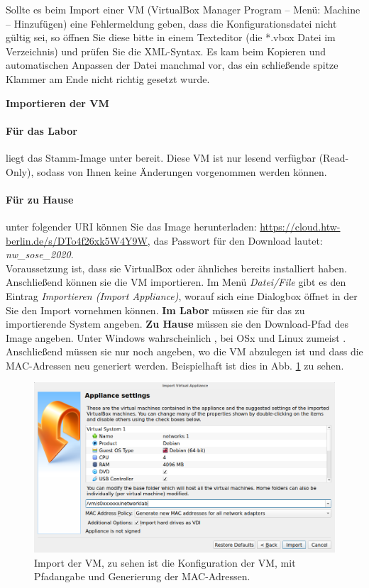 \documentclass[paper=a4,fontsize=11pt]{scrartcl}%
\numberwithin{equation}{section}
\begin{document}
Sollte es beim Import einer VM (VirtualBox Manager Program -- Menü: Machine -- Hinzufügen) eine Fehlermeldung geben, dass die Konfigurationsdatei nicht gültig sei, so öffnen Sie diese bitte in einem Texteditor (die *.vbox Datei im Verzeichnis) und prüfen Sie die XML-Syntax. Es kam beim Kopieren und automatischen Anpassen der Datei manchmal vor, das ein schließende spitze Klammer am Ende nicht richtig gesetzt wurde.

\begin{center}
\Large{\textbf{Importieren der VM}}
\end{center}
\paragraph{Für das Labor} liegt das Stamm-Image unter  bereit. Diese VM ist nur lesend verfügbar (Read-Only), sodass von Ihnen keine Änderungen vorgenommen werden können.\\
\paragraph{Für zu Hause} unter folgender URI können Sie das Image herunterladen: \url{https://cloud.htw-berlin.de/s/DTo4f26xk5W4Y9W}, das Passwort für den Download lautet: \emph{nw\_sose\_2020}.\\
Voraussetzung ist, dass sie VirtualBox oder ähnliches bereits installiert haben. Anschließend können sie die VM importieren. Im Menü \emph{Datei/File} gibt es den Eintrag \emph{Importieren (Import Appliance)}, worauf sich eine Dialogbox öffnet in der Sie den Import vornehmen können. \textbf{Im Labor} müssen sie für das zu importierende System  angeben. \textbf{Zu Hause} müssen sie den Download-Pfad des Image angeben. Unter Windows wahrscheinlich , bei OSx und Linux zumeist .\\
Anschließend müssen sie nur noch angeben, wo die VM abzulegen ist und dass die MAC-Adressen neu generiert werden. Beispielhaft ist dies in Abb. \ref{import_vm} zu sehen.
\begin{figure}[H]
	\centering
	\includegraphics[scale=0.3]{vm_import}
	\caption{Import der VM, zu sehen ist die Konfiguration der VM, mit Pfadangabe und Generierung der MAC-Adressen.}
	\label{import_vm}
\end{figure} 
\end{document}
